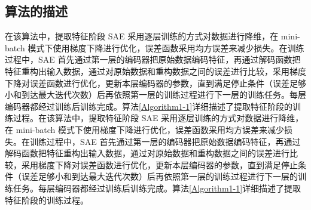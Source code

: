 \subsection{算法的描述}
在该算法中，提取特征阶段 SAE 采用逐层训练的方式对数据进行降维，在 mini-batch 模式下使用梯度下降进行优化，误差函数采用均方误差来减少损失。在训练过程中，SAE 首先通过第一层的编码器把原始数据编码特征，再通过解码函数把特征重构出输入数据，通过对原始数据和重构数据之间的误差进行比较，采用梯度下降对误差函数进行优化，更新本层编码器的参数，直到满足停止条件（误差足够小和到达最大迭代次数）后再依照第一层的训练过程进行下一层的训练任务。每层编码器都经过训练后训练完成。算法\ref{Algorithm1-1}详细描述了提取特征阶段的训练过程。在该算法中，提取特征阶段 SAE 采用逐层训练的方式对数据进行降维，在 mini-batch 模式下使用梯度下降进行优化，误差函数采用均方误差来减少损失。在训练过程中，SAE 首先通过第一层的编码器把原始数据编码特征，再通过解码函数把特征重构出输入数据，通过对原始数据和重构数据之间的误差进行比较，采用梯度下降对误差函数进行优化，更新本层编码器的参数，直到满足停止条件（误差足够小和到达最大迭代次数）后再依照第一层的训练过程进行下一层的训练任务。每层编码器都经过训练后训练完成。算法\ref{Algorithm1-1}详细描述了提取特征阶段的训练过程。
\vspace{10pt}
